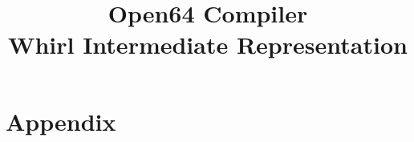 \documentclass[letterpaper]{book}
\begin{document}
\title{\Huge\bf Open64 Compiler\\
Whirl Intermediate Representation}
\maketitle
\tableofcontents
\clearpage


\clearpage
\chapter{Appendix}
\listoffigures
\printindex
\end{document}
